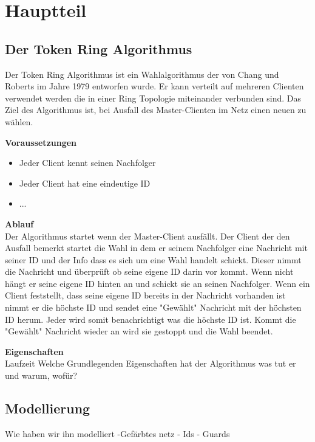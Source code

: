 \section{Hauptteil} 

\subsection{Der Token Ring Algorithmus}
Der Token Ring Algorithmus ist ein Wahlalgorithmus der von Chang und Roberts im Jahre 1979 entworfen wurde. Er kann verteilt auf mehreren Clienten verwendet werden die in einer Ring Topologie miteinander verbunden sind. Das Ziel des Algorithmus ist, bei Ausfall des Master-Clienten im Netz einen neuen zu wählen.

\textbf{Voraussetzungen}
\begin{itemize}
	\item Jeder Client kennt seinen Nachfolger
	\item Jeder Client hat eine eindeutige ID
	\item ...
\end{itemize}

\textbf{Ablauf}\\
Der Algorithmus startet wenn der Master-Client ausfällt. Der Client der den Ausfall bemerkt startet die Wahl in dem er seinem Nachfolger eine Nachricht mit seiner ID und der Info dass es sich um eine Wahl handelt schickt. Dieser nimmt die Nachricht und überprüft ob seine eigene ID darin vor kommt. Wenn nicht hängt er seine eigene ID hinten an und schickt sie an seinen Nachfolger.
Wenn ein Client feststellt, dass seine eigene ID bereits in der Nachricht vorhanden ist nimmt er die höchste ID und sendet eine "Gewählt" Nachricht mit der höchsten ID herum. Jeder wird somit benachrichtigt was die höchste ID ist. Kommt die "Gewählt" Nachricht wieder an wird sie gestoppt und die Wahl beendet.

\textbf{Eigenschaften}\\
 Laufzeit
Welche Grundlegenden Eigenschaften hat der Algorithmus
was tut er und warum, wofür?

\subsection{Modellierung}
Wie haben wir ihn modelliert
-Gefärbtes netz
- Ids
- Guards

